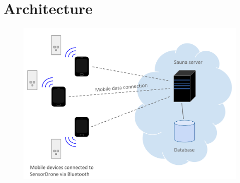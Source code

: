 \documentclass[11pt]{article}
\begin{document}
\section{Architecture}
\begin{figure}[h!]
\includegraphics[width=\textwidth, height=\textheight, keepaspectratio]{design.pdf}
\end{figure}
\end{document}
